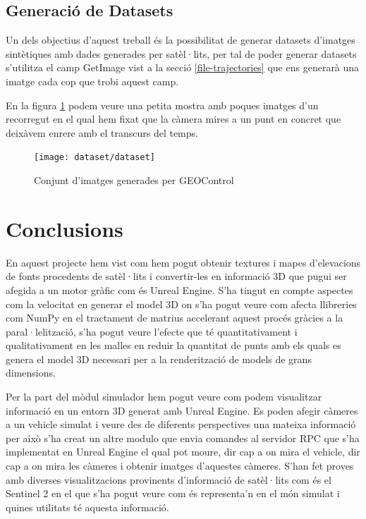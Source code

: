 \documentclass[10pt,a4paper,twocolumn,twoside]{article}
\begin{document}
\subsection{Generació de Datasets}
Un dels objectius d'aquest treball és la possibilitat de generar datasets d'imatges sintètiques amb dades generades per satèl·lits, per tal de poder generar datasets s'utilitza el camp GetImage vist a la secció \ref{file-trajectories} que ens generarà una imatge cada cop que trobi aquest camp.

En la figura \ref{fig-dataset} podem veure una petita mostra amb poques imatges d'un recorregut en el qual hem fixat que la càmera mires a un punt en concret que deixàvem enrere amb el transcurs del temps. 

\begin{figure}[!h]
\centering
  	\texttt{[image: dataset/dataset]}
	\caption{Conjunt d'imatges generades per GEOControl}
	\label{fig-dataset}
\end{figure}

\section{Conclusions}
En aquest projecte hem vist com hem pogut obtenir textures i mapes d'elevacions de fonts procedents de satèl·lits i convertir-les en informació 3D que pugui ser afegida a un motor gràfic com és Unreal Engine. S'ha tingut en compte aspectes com la velocitat en generar el model 3D on s'ha pogut veure com afecta llibreries com NumPy en el tractament de matrius accelerant aquest procés gràcies a la paral·lelització, s'ha pogut veure l'efecte que té quantitativament i qualitativament en les malles en reduir la quantitat de punts amb els quals es genera el model 3D necessari per a la renderització de models de grans dimensions.

Per la part del mòdul simulador hem pogut veure com podem visualitzar informació en un entorn 3D generat amb Unreal Engine. Es poden afegir càmeres a un vehicle simulat i veure des de diferents perspectives una mateixa informació per això s'ha creat un altre modulo que envia comandes al servidor RPC que s'ha implementat en Unreal Engine el qual pot moure, dir cap a on mira el vehicle, dir cap a on mira les càmeres i obtenir imatges d'aquestes càmeres.
S'han fet proves amb diverses visualitzacions provinents d'informació de satèl·lits com és el Sentinel 2 en el que s'ha pogut veure com és representa'n en el món simulat i quines utilitats té aquesta informació.
\end{document}
